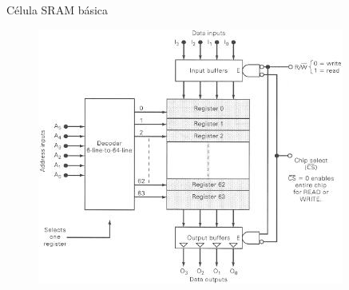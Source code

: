 \documentclass[aspectratio=169,
				xcolor=table]{beamer}
\begin{document}
	\begin{frame}{Célula SRAM básica}
		\begin{figure}[hbtp]
		\centering
		\includegraphics[height=0.8\textheight, keepaspectratio]{../figs/cap07/sram64x4}
		\end{figure}
		
	\end{frame}
	
	
\end{document}
